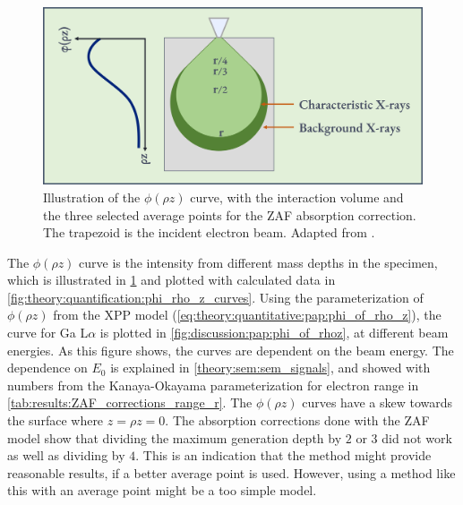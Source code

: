 \begin{figure}[htbp]
    \centering
    \includegraphics[width=0.8\linewidth]{figures/discussion/phi_rhoz_illustrated_with_interaction_volume.png}
    \caption{
        Illustration of the $\phi (\rho z)$ curve, with the interaction volume and the three selected average points for the ZAF absorption correction.
        The trapezoid is the incident electron beam.
        Adapted from \cite[Fig. 19.7]{goldstein_scanning_2018}.
    }
    \label{fig:discussion:depth_generation_iv}
\end{figure}

The $\phi (\rho z)$ curve is the intensity from different mass depths in the specimen, which is illustrated in \cref{fig:discussion:depth_generation_iv} and plotted with calculated data in \cref{fig:theory:quantification:phi_rho_z_curves}.
Using the parameterization of $\phi (\rho z)$ from the XPP model (\cref{eq:theory:quantitative:pap:phi_of_rho_z}), the curve for Ga L$\alpha$ is plotted in \cref{fig:discussion:pap:phi_of_rhoz}, at different beam energies.
As this figure shows, the curves are dependent on the beam energy.
The dependence on $E_0$ is explained in \cref{theory:sem:sem_signals}, and showed with numbers from the Kanaya-Okayama parameterization for electron range in \cref{tab:results:ZAF_corrections_range_r}.
The $\phi (\rho z)$ curves have a skew towards the surface where $z = \rho z = 0$.
The absorption corrections done with the ZAF model show that dividing the maximum generation depth by $2$ or $3$ did not work as well as dividing by $4$.
This is an indication that the method might provide reasonable results, if a better average point is used.
However, using a method like this with an average point might be a too simple model.


